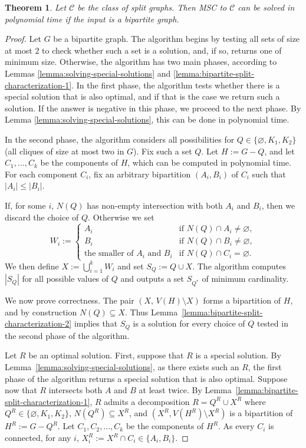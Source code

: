 \documentclass[11pt]{article}
\newtheorem{theorem}{Theorem}
\theoremstyle{definition}
\begin{document}
\begin{theorem}
\label{thm:bipartite-split}
Let $\mathcal{C}$ be the class of split graphs.  
Then MSC to $\mathcal{C}$ can be solved in polynomial time if the input is a bipartite graph.
\end{theorem}
\begin{proof}

Let $G$ be a bipartite graph. 
The algorithm begins by testing all sets of size at most $2$ to check whether such a set is a solution, and, if so, returns one of minimum size.
Otherwise, the algorithm has two main phases, according to Lemmas \ref{lemma:solving-special-solutions} and \ref{lemma:bipartite-split-characterization-1}.
In the first phase, the algorithm tests whether there is a special solution that is also optimal, and if that is the case we return such a solution. If the answer is negative in this phase, we proceed to the next phase. By Lemma \ref{lemma:solving-special-solutions}, this can be done in polynomial time.

In the second phase, the algorithm considers all possibilities for $Q\in\{\varnothing,K_1,K_2\}$
 (all cliques of size at most two in $G$).  
Fix such a set $Q$.  
Let $H := G - Q$, and let $C_1,\dots,C_k$ be the components of $H$, which can be computed in polynomial time.  
For each component $C_i$, fix an arbitrary bipartition $(A_i,B_i)$ of $C_i$ such that $|A_i|\le |B_i|$.

If, for some $i$, $N(Q)$ has non-empty intersection with both $A_i$ and $B_i$, then
we discard the choice of $Q$.  
Otherwise we set
\[
W_i :=
\begin{cases}
A_i & \text{if } N(Q)\cap A_i\neq\varnothing,\\[2pt]
B_i & \text{if } N(Q)\cap B_i\neq\varnothing,\\[2pt]
\text{the smaller of }A_i\text{ and }B_i & \text{if }N(Q)\cap C_i=\varnothing.
\end{cases}
\]
We then define $X := \bigcup_{i=1}^k W_i$ and set $S_Q := Q \cup X$.  
The algorithm computes $|S_Q|$ for all possible values of $Q$ and outputs a set $S_{Q^*}$ of minimum cardinality.

We now prove correctness. 
The pair $(X,\, V(H)\setminus X)$ forms a bipartition of $H$, and by construction $N(Q)\subseteq X$.  
Thus Lemma~\ref{lemma:bipartite-split-characterization-2} implies that $S_Q$ is a solution for every choice of $Q$ tested in the second phase of the algorithm.

Let $R$ be an optimal solution. First, suppose that $R$ is a special solution.
By Lemma~\ref{lemma:solving-special-solutions}, as there exists such an $R$, the first phase of the algorithm returns a special solution that is also optimal.
Suppose now that $R$ intersects both $A$ and $B$ at least twice.
By Lemma~\ref{lemma:bipartite-split-characterization-1}, $R$ admits a decomposition  
$R = Q^R \cup X^R$ where $Q^R\in\{\varnothing,K_1,K_2\}$,  
$N(Q^R)\subseteq X^R$, and $(X^R, V(H^R)\setminus X^R)$ is a bipartition of $H^R := G - Q^R$.
Let $C_1,C_2,\ldots ,C_k$ be the components of $H^R$.
As every $C_i$ is connected, for any $i$, $X_i^R := X^R \cap C_i \in \{A_i,B_i\}$.



\end{proof}
\end{document}
